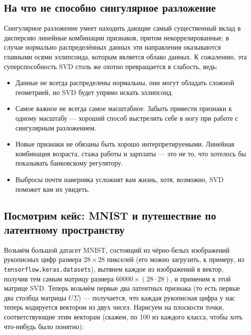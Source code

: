 \documentclass{amsart}
\theoremstyle{definition}
\theoremstyle{remark}
\numberwithin{equation}{section}
\begin{document}
\subsection{На что не способно сингулярное разложение} Сингулярное разложение умеет находить дающие самый существенный вклад в дисперсию линейные комбинации признаков, притом некоррелированные; в случае нормально распределённых данных эти направления оказываются главными осями эллипсоида, которым является облако данных. К сожалению, эта суперспособность SVD столь же охотно превращается в слабость, ведь:
\begin{itemize}
\item Данные не всегда распределены нормальны, они могут обладать сложной геометрией, но SVD будет упрямо искать эллипсоид.
\item Самое важное не всегда самое масштабное. Забыть привести признаки к одному масштабу --- хороший способ выстрелить себе в ногу при работе с сингулярным разложением.
\item Новые признаки не обязаны быть хорошо интерпретируемыми. Линейная комбинация возраста, стажа работы и зарплаты --- это не то, что хотелось бы показывать банковскому регулятору.
\item Выбросы почти наверняка усложнят вам жизнь, хотя, возможно, SVD поможет вам их увидеть.
\end{itemize}

\subsection{Посмотрим кейс: MNIST и путешествие по латентному пространству}

Возьмём большой датасет MNIST, состоящий из чёрно-белых изображений рукописных цифр размера $28\times28$ пикселей (его можно загрузить, к примеру, из \texttt{tensorflow.keras.datasets}), вытянем каждое из изображений в вектор, получив тем самым матрицу размера $60000\times(28\cdot28)$, и применим к этой матрице SVD. Теперь возьмём первые два латентных признака (то есть первые два столбца матрицы $U\Sigma$) --- получается, что каждая рукописная цифра у нас теперь кодируется вектором из двух чисел. Нарисуем на плоскости точки, соответствующие этим векторам (скажем, по 100 из каждого класса, чтобы хоть что-нибудь было понятно):

\begin{center}
\end{center}
\end{document}
